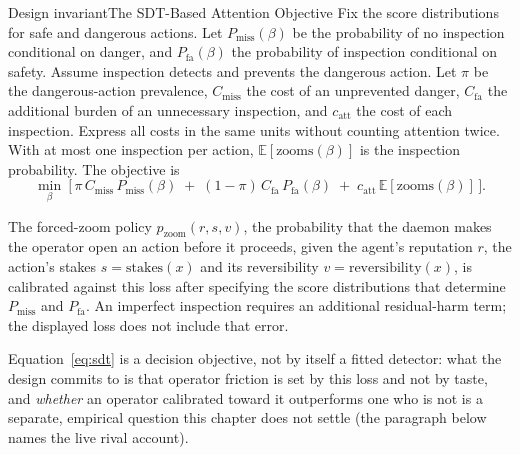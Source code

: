 \documentclass[11pt,a4paper]{article}
\theoremstyle{definition}
\theoremstyle{plain}
\begin{document}
\begin{pdclaim}{Design invariant}{The SDT-Based Attention Objective}
\setlength{\parskip}{4pt plus 1pt}
\label{def:sdt}
Fix the score distributions for safe and dangerous actions. Let
$P_{\text{miss}}(\beta)$ be the probability of no inspection conditional on danger,
and $P_{\text{fa}}(\beta)$ the probability of inspection conditional on safety.
Assume inspection detects and prevents the dangerous action. Let $\pi$ be the
dangerous-action prevalence, $C_{\text{miss}}$ the cost of an unprevented danger,
$C_{\text{fa}}$ the additional burden of an unnecessary inspection, and
$c_{\mathrm{att}}$ the cost of each inspection. Express all costs in the same
units without counting attention twice. With at most one inspection per action,
$\mathbb{E}[\text{zooms}(\beta)]$ is the inspection probability. The objective is
\begin{equation}\label{eq:sdt}
\min_{\beta}\ \Big[\, \pi\,C_{\text{miss}}\,P_{\text{miss}}(\beta)
   \;+\; (1-\pi)\,C_{\text{fa}}\,P_{\text{fa}}(\beta)
   \;+\; c_{\mathrm{att}}\,\mathbb{E}[\text{zooms}(\beta)] \,\Big].
\end{equation}

The forced-zoom policy $p_{\mathrm{zoom}}(r,s,v)$, the probability that the daemon makes the
operator open an action before it proceeds, given the agent's reputation $r$, the
action's stakes $s=\mathrm{stakes}(x)$ and its reversibility $v=\mathrm{reversibility}(x)$, is calibrated against this loss after specifying
the score distributions that determine $P_{\text{miss}}$ and $P_{\text{fa}}$.
An imperfect inspection requires an additional residual-harm term; the displayed
loss does not include that error.

Equation~\ref{eq:sdt} is a decision objective, not by itself a fitted detector: what
the design commits to is that operator friction is set by this loss and not by taste,
and \emph{whether} an operator calibrated toward it outperforms one who is not is a
separate, empirical question this chapter does not settle (the paragraph below names
the live rival account).
\end{pdclaim}
\end{document}
